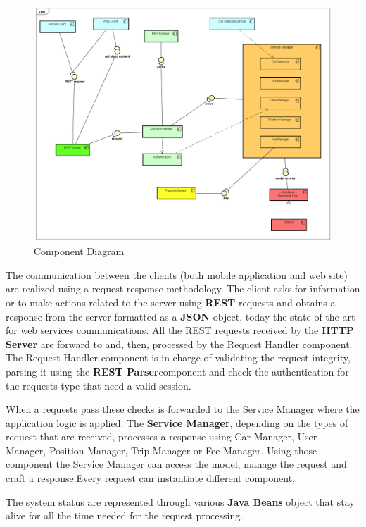 \begin{figure}[H]	
	\centering
	\includegraphics[width=\textwidth]{img/Component_diagram}
	\caption{Component Diagram}
\end{figure}

The communication between the clients (both mobile application and web site) are realized using a request-response methodology. The client asks for information or to make actions related to the server using \textbf{REST} requests and obtains a response from the server formatted as a \textbf{JSON} object, today the state of the art for web services communications. 
All the REST requests received by the \textbf{HTTP Server} are forward to and, then, processed by the Request Handler component. The Request Handler component is in charge of validating the request integrity, parsing it using the \textbf{REST Parser}component and check the authentication for the requests type that need a valid session.

When a requests pass these checks is forwarded to the Service Manager where the application logic is applied.
The \textbf{Service Manager}, depending on the types of request that are received,  processes a response using Car Manager, User Manager, Position Manager, Trip Manager or Fee Manager.
Using those component the Service Manager can access the model, manage the request and craft a response.Every request can instantiate different component,

The system status are represented through various \textbf{Java Beans} object that stay alive for all the time needed for the request processing.

